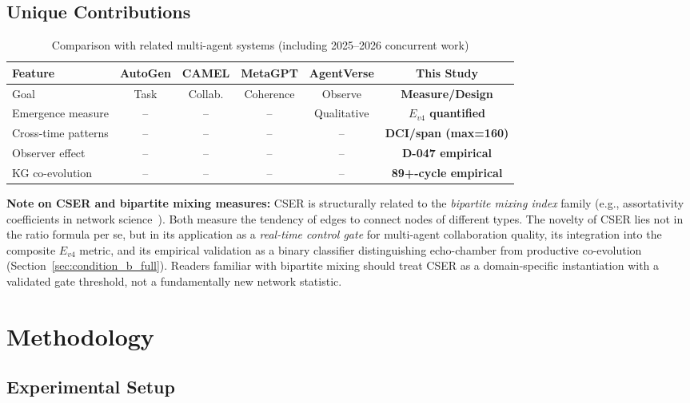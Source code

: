 \documentclass[12pt]{article}
\begin{document}
\subsection{Unique Contributions}

\begin{table}[h!]
\centering\small
\begin{tabular}{lccccc}
\toprule
Feature & AutoGen & CAMEL & MetaGPT & AgentVerse & \textbf{This Study} \\
\midrule
Goal & Task & Collab. & Coherence & Observe & \textbf{Measure/Design} \\
Emergence measure & -- & -- & -- & Qualitative & \textbf{$E_{v4}$ quantified} \\
Cross-time patterns & -- & -- & -- & -- & \textbf{DCI/span (max=160)} \\
Observer effect & -- & -- & -- & -- & \textbf{D-047 empirical} \\
KG co-evolution & -- & -- & -- & -- & \textbf{89+-cycle empirical} \\
\bottomrule
\end{tabular}
\caption{Comparison with related multi-agent systems (including 2025--2026 concurrent work)}
\end{table}

\noindent\textbf{Note on CSER and bipartite mixing measures:}
CSER is structurally related to the \emph{bipartite mixing index} family
(e.g., assortativity coefficients in network science~\cite{newman2003mixing,barabasi1999emergence}).
Both measure the tendency of edges to connect nodes of different types.
The novelty of CSER lies not in the ratio formula per se, but in its application
as a \emph{real-time control gate} for multi-agent collaboration quality, its
integration into the composite $E_{v4}$ metric, and its empirical validation as
a binary classifier distinguishing echo-chamber from productive co-evolution
(Section~\ref{sec:condition_b_full}). Readers familiar with bipartite mixing
should treat CSER as a domain-specific instantiation with a validated gate
threshold, not a fundamentally new network statistic.

\section{Methodology}

\subsection{Experimental Setup}
\end{document}
